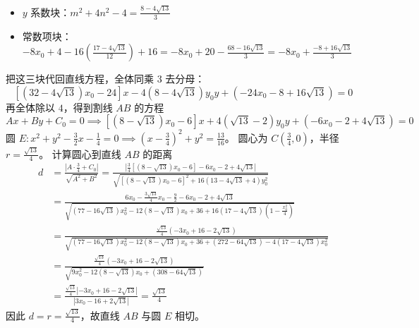 \begin{solution}
\begin{itemize}
\item $y$ 系数块：$m^2 + 4n^2 - 4 = \frac{8 - 4\sqrt{13}}{3}$
\item 常数项块：$-8x_0 + 4 - 16\left(\frac{17 - 4\sqrt{13}}{12}\right) + 16 = -8x_0 + 20 - \frac{68 - 16\sqrt{13}}{3} = -8x_0 + \frac{-8 + 16\sqrt{13}}{3}$
\end{itemize}
把这三块代回直线方程，全体同乘 $3$ 去分母：
$$[ (32 - 4\sqrt{13})x_0 - 24 ]x - 4(8 - 4\sqrt{13})y_0 y + (-24x_0 - 8 + 16\sqrt{13}) = 0$$
再全体除以 $4$，得到割线 $AB$ 的方程
$$A x + B y + C_0 = 0 \implies [(8 - \sqrt{13})x_0 - 6]x + 4(\sqrt{13} - 2)y_0 y + (-6x_0 - 2 + 4\sqrt{13}) = 0$$
圆 $E: x^2 + y^2 - \frac{3}{2}x - \frac{1}{4} = 0 \implies \left(x - \frac{3}{4}\right)^2 + y^2 = \frac{13}{16}$。
圆心为 $C\left(\frac{3}{4}, 0\right)$，半径 $r = \frac{\sqrt{13}}{4}$。
计算圆心到直线 $AB$ 的距离
\begin{align*}
d &= \frac{|A \cdot \frac{3}{4} + C_0|}{\sqrt{A^2 + B^2}}= \frac{|\frac{3}{4}[(8 - \sqrt{13})x_0 - 6] - 6x_0 - 2 + 4\sqrt{13}|}{\sqrt{[(8 - \sqrt{13})x_0 - 6]^2+16(13 - 4\sqrt{13} + 4)y_0^2 }}\\
&=\frac{6x_0 - \frac{3\sqrt{13}}{4}x_0 - \frac{9}{2} - 6x_0 - 2 + 4\sqrt{13}}{\sqrt{(77 - 16\sqrt{13})x_0^2 - 12(8 - \sqrt{13})x_0 + 36+ 16(17 - 4\sqrt{13}) \left(1 - \frac{x_0^2}{4}\right) }}\\
&=\frac{\frac{\sqrt{13}}{4} \left( -3x_0 + 16 - 2\sqrt{13} \right)}{\sqrt{(77 - 16\sqrt{13})x_0^2- 12(8 - \sqrt{13})x_0 + 36+(272 - 64\sqrt{13}) - 4(17 - 4\sqrt{13})x_0^2 }}\\
&=\frac{\frac{\sqrt{13}}{4} \left( -3x_0 + 16 - 2\sqrt{13} \right)}{\sqrt{ 9x_0^2 - 12(8 - \sqrt{13})x_0 + (308 - 64\sqrt{13})}}\\
&= \frac{\frac{\sqrt{13}}{4} |-3x_0 + 16 - 2\sqrt{13}|}{|3x_0 - 16 + 2\sqrt{13}|} = {\frac{\sqrt{13}}{4}}
\end{align*}
因此 $d=r=\frac{\sqrt{13}}{4}$，故直线 $AB$ 与圆 $E$ 相切。
\end{solution}

